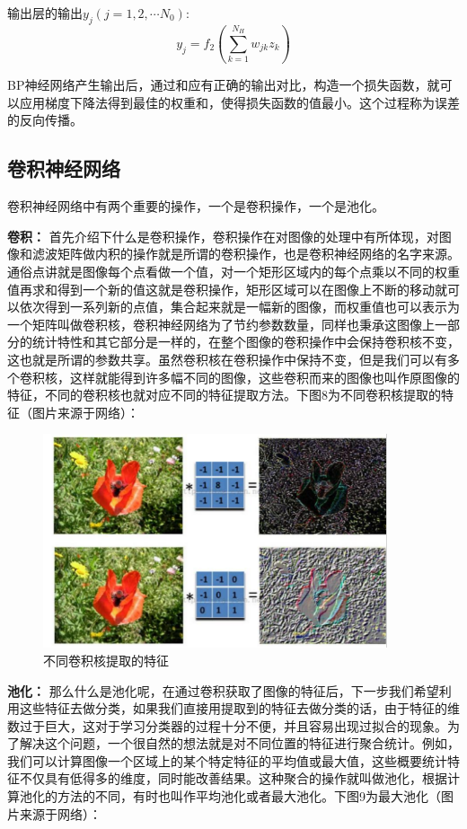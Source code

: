\documentclass{article} %
\begin{document}
\begin{CJK*}{UTF8}{gkai}
输出层的输出$y_{j}\left( j=1,2,\cdots N_{0} \right)$:
\begin{equation} 
y_{j}=f_{2}\left( \sum_{k=1}^{N_{H}}w_{jk}z_{k} \right)
\end{equation}

BP神经网络产生输出后，通过和应有正确的输出对比，构造一个损失函数，就可以应用梯度下降法得到最佳的权重和，使得损失函数的值最小。这个过程称为误差的反向传播。

\subsection{卷积神经网络}
卷积神经网络中有两个重要的操作，一个是卷积操作，一个是池化。

\textbf{卷积：} 首先介绍下什么是卷积操作，卷积操作在对图像的处理中有所体现，对图像和滤波矩阵做内积的操作就是所谓的卷积操作，也是卷积神经网络的名字来源。通俗点讲就是图像每个点看做一个值，对一个矩形区域内的每个点乘以不同的权重值再求和得到一个新的值这就是卷积操作，矩形区域可以在图像上不断的移动就可以依次得到一系列新的点值，集合起来就是一幅新的图像，而权重值也可以表示为一个矩阵叫做卷积核，卷积神经网络为了节约参数数量，同样也秉承这图像上一部分的统计特性和其它部分是一样的，在整个图像的卷积操作中会保持卷积核不变，这也就是所谓的参数共享。虽然卷积核在卷积操作中保持不变，但是我们可以有多个卷积核，这样就能得到许多幅不同的图像，这些卷积而来的图像也叫作原图像的特征，不同的卷积核也就对应不同的特征提取方法。下图8为不同卷积核提取的特征（图片来源于网络）：

\begin{figure}[h]
\begin{center}

\includegraphics[width=4in]{8.png}

\end{center}
\caption{不同卷积核提取的特征}
\end{figure}

\textbf{池化：} 那么什么是池化呢，在通过卷积获取了图像的特征后，下一步我们希望利用这些特征去做分类，如果我们直接用提取到的特征去做分类的话，由于特征的维数过于巨大，这对于学习分类器的过程十分不便，并且容易出现过拟合的现象。为了解决这个问题，一个很自然的想法就是对不同位置的特征进行聚合统计。例如，我们可以计算图像一个区域上的某个特定特征的平均值或最大值，这些概要统计特征不仅具有低得多的维度，同时能改善结果。这种聚合的操作就叫做池化，根据计算池化的方法的不同，有时也叫作平均池化或者最大池化。下图9为最大池化（图片来源于网络）：


\end{CJK*}
\end{document}
